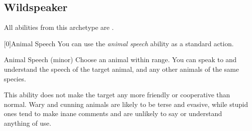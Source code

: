 

    \newpage
    \subsection{Wildspeaker}\label{Wildspeaker}
        All abilities from this archetype are .

        [0]{Animal Speech} You can use the \textit{animal speech} ability as a standard action.
        \begin{durationability}{Animal Speech}
             (minor)
            \rankline
            Choose an animal within \rnglong range.
            You can speak to and understand the speech of the target animal, and any other animals of the same species.

            This ability does not make the target any more friendly or cooperative than normal.
            Wary and cunning animals are likely to be terse and evasive, while stupid ones tend to make inane comments and are unlikely to say or understand anything of use.
        \end{durationability}

